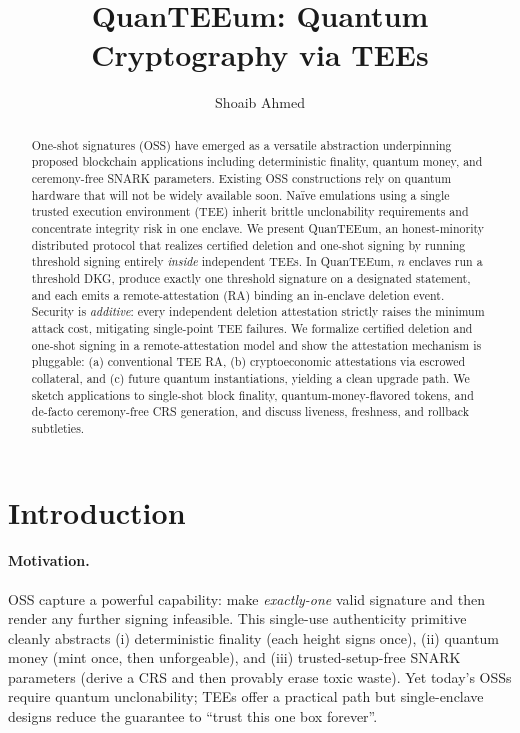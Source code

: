 \documentclass[runningheads,orivec]{llncs}
\newcommand{\prot}{\textsf{QuanTEEum}}
\begin{document}
\title{QuanTEEum: Quantum Cryptography via TEEs}
\author{Shoaib Ahmed}
\maketitle

\begin{abstract}
One-shot signatures (OSS) have emerged as a versatile abstraction underpinning proposed blockchain applications including deterministic finality, quantum money, and ceremony-free SNARK parameters. Existing OSS constructions rely on quantum hardware that will not be widely available soon. Naïve emulations using a single trusted execution environment (TEE) inherit brittle unclonability requirements and concentrate integrity risk in one enclave. We present \prot{}, an honest-minority distributed protocol that realizes certified deletion and one-shot signing by running threshold signing entirely \emph{inside} independent TEEs. In \prot{}, $n$ enclaves run a threshold DKG, produce exactly one threshold signature on a designated statement, and each emits a remote-attestation (RA) binding an in-enclave deletion event. Security is \emph{additive}: every independent deletion attestation strictly raises the minimum attack cost, mitigating single-point TEE failures. We formalize certified deletion and one-shot signing in a remote-attestation model and show the attestation mechanism is pluggable: (a) conventional TEE RA, (b) cryptoeconomic attestations via escrowed collateral, and (c) future quantum instantiations, yielding a clean upgrade path. We sketch applications to single-shot block finality, quantum-money-flavored tokens, and de-facto ceremony-free CRS generation, and discuss liveness, freshness, and rollback subtleties.
\end{abstract}

\section{Introduction}
\paragraph{Motivation.}
OSS capture a powerful capability: make \emph{exactly-one} valid signature and then render any further signing infeasible. This single-use authenticity primitive cleanly abstracts (i) deterministic finality (each height signs once), (ii) quantum money (mint once, then unforgeable), and (iii) trusted-setup-free SNARK parameters (derive a CRS and then provably erase toxic waste). Yet today’s OSSs require quantum unclonability; TEEs offer a practical path but single-enclave designs reduce the guarantee to “trust this one box forever”.
\end{document}
